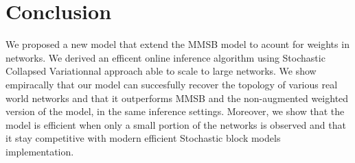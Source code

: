\section{Conclusion}
\label{sec:concl}

We proposed a new model that extend the MMSB model to acount for weights in networks. We derived an efficent online inference algorithm using Stochastic Collapsed Variationnal approach able to scale to large networks. We show empiracally that our model can succesfully recover the topology of various real world networks and that it outperforms MMSB and the non-augmented weighted version of the model, in the same inference settings. Moreover, we show that the model is efficient when only a  small portion of the networks is observed and that it stay competitive with modern efficient Stochastic block models implementation.

